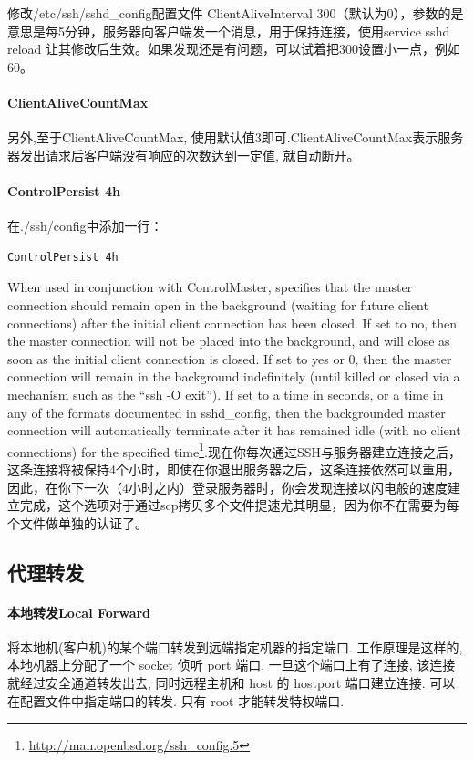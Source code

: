\documentclass[letter]{book}
\begin{document}
修改/etc/ssh/sshd\_config配置文件 ClientAliveInterval 300（默认为0），参数的是意思是每5分钟，服务器向客户端发一个消息，用于保持连接，使用service sshd reload 让其修改后生效。如果发现还是有问题，可以试着把300设置小一点，例如60。

\paragraph{ClientAliveCountMax}

另外,至于ClientAliveCountMax, 使用默认值3即可.ClientAliveCountMax表示服务器发出请求后客户端没有响应的次数达到一定值, 就自动断开。

\paragraph{ControlPersist 4h}

在./ssh/config中添加一行：

\begin{lstlisting}[language=Bash]
ControlPersist 4h
\end{lstlisting}

When used in conjunction with ControlMaster, specifies that the master connection should remain open in the background (waiting for future client connections) after the initial client connection has been closed. If set to no, then the master connection will not be placed into the background, and will close as soon as the initial client connection is closed. If set to yes or 0, then the master connection will remain in the background indefinitely (until killed or closed via a mechanism such as the “ssh -O exit”). If set to a time in seconds, or a time in any of the formats documented in sshd\_config, then the backgrounded master connection will automatically terminate after it has remained idle (with no client connections) for the specified time\footnote{\url{http://man.openbsd.org/ssh_config.5}}.现在你每次通过SSH与服务器建立连接之后，这条连接将被保持4个小时，即使在你退出服务器之后，这条连接依然可以重用，因此，在你下一次（4小时之内）登录服务器时，你会发现连接以闪电般的速度建立完成，这个选项对于通过scp拷贝多个文件提速尤其明显，因为你不在需要为每个文件做单独的认证了。

\subsection{代理转发}

\paragraph{本地转发Local Forward}将本地机(客户机)的某个端口转发到远端指定机器的指定端口. 工作原理是这样的, 本地机器上分配了一个 socket 侦听 port 端口, 一旦这个端口上有了连接, 该连接就经过安全通道转发出去, 同时远程主机和 host 的 hostport 端口建立连接. 可以在配置文件中指定端口的转发. 只有 root 才能转发特权端口. 
\end{document}
